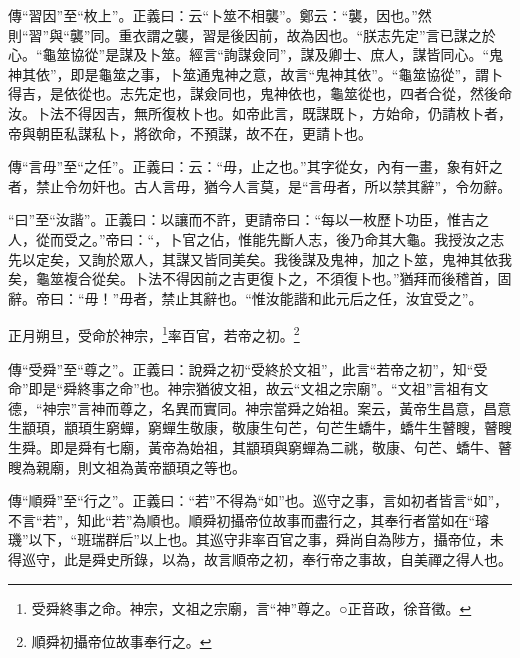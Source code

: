 {\noindent\zhuan{}\fzbyks 傳“習因”至“枚上”。正義曰：云“卜筮不相襲”。鄭云：“襲，因也。”然則“習”與“襲”同。重衣謂之襲，習是後因前，故為因也。“朕志先定”言已謀之於心。“龜筮協從”是謀及卜筮。經言“詢謀僉同”，謀及卿士、庶人，謀皆同心。“鬼神其依”，即是龜筮之事，卜筮通鬼神之意，故言“鬼神其依”。“龜筮協從”，謂卜得吉，是依從也。志先定也，謀僉同也，鬼神依也，龜筮從也，四者合從，然後命汝。卜法不得因吉，無所復枚卜也。如帝此言，既謀既卜，方始命，仍請枚卜者，帝與朝臣私謀私卜，將欲命，不預謀，故不在，更請卜也。 \par}

{\noindent\zhuan{}\fzbyks 傳“言毋”至“之任”。正義曰：云：“毋，止之也。”其字從女，內有一畫，象有奸之者，禁止令勿奸也。古人言毋，猶今人言莫，是“言毋者，所以禁其辭”，令勿辭。 \par}

{\noindent\shu{}\fzkt “曰”至“汝諧”。正義曰：以讓而不許，更請帝曰：“每以一枚歷卜功臣，惟吉之人，從而受之。”帝曰：“，卜官之佔，惟能先斷人志，後乃命其大龜。我授汝之志先以定矣，又詢於眾人，其謀又皆同美矣。我後謀及鬼神，加之卜筮，鬼神其依我矣，龜筮複合從矣。卜法不得因前之吉更復卜之，不須復卜也。”猶拜而後稽首，固辭。帝曰：“毋！”毋者，禁止其辭也。“惟汝能諧和此元后之任，汝宜受之”。 \par}

正月朔旦，受命於神宗，\footnote{受舜終事之命。神宗，文祖之宗廟，言“神”尊之。○正音政，徐音徵。}率百官，若帝之初。\footnote{順舜初攝帝位故事奉行之。}

{\noindent\zhuan{}\fzbyks 傳“受舜”至“尊之”。正義曰：說舜之初“受終於文祖”，此言“若帝之初”，知“受命”即是“舜終事之命”也。神宗猶彼文祖，故云“文祖之宗廟”。“文祖”言祖有文德，“神宗”言神而尊之，名異而實同。神宗當舜之始祖。案云，黃帝生昌意，昌意生顓頊，顓頊生窮蟬，窮蟬生敬康，敬康生句芒，句芒生蟜牛，蟜牛生瞽瞍，瞽瞍生舜。即是舜有七廟，黃帝為始祖，其顓頊與窮蟬為二祧，敬康、句芒、蟜牛、瞽瞍為親廟，則文祖為黃帝顓頊之等也。 \par}

{\noindent\zhuan{}\fzbyks 傳“順舜”至“行之”。正義曰：“若”不得為“如”也。巡守之事，言如初者皆言“如”，不言“若”，知此“若”為順也。順舜初攝帝位故事而盡行之，其奉行者當如在“璿璣”以下，“班瑞群后”以上也。其巡守非率百官之事，舜尚自為陟方，攝帝位，未得巡守，此是舜史所錄，以為，故言順帝之初，奉行帝之事故，自美禪之得人也。 \par}

